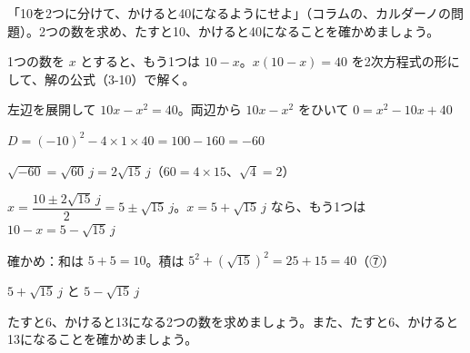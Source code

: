 \begin{reidai}
「10を2つに分けて、かけると40になるようにせよ」（コラムの、カルダーノの問題）。2つの数を求め、たすと10、かけると40になることを確かめましょう。\par
\kangaekata 1つの数を $x$ とすると、もう1つは $10-x$。$x(10-x)=40$ を2次方程式の形にして、解の公式（3-10）で解く。\par
\shiki{}\zw{} 左辺を展開して $10x-x^2=40$。両辺から $10x-x^2$ をひいて $0=x^2-10x+40$\par
\bkviia $D=(-10)^2-4\times1\times40=100-160=-60$\par
\bkviia $\sqrt{-60}=\sqrt{60}\,j=2\sqrt{15}\,j$（$60=4\times15$、$\sqrt4=2$）\par
\bkviia $x=\dfrac{10\pm2\sqrt{15}\,j}{2}=5\pm\sqrt{15}\,j$。$x=5+\sqrt{15}\,j$ なら、もう1つは $10-x=5-\sqrt{15}\,j$\par
\bkviia 確かめ：和は $5+5=10$。積は $5^2+(\sqrt{15})^2=25+15=40$（⑦）\par
\kotae{}\zw{} $5+\sqrt{15}\,j$ と $5-\sqrt{15}\,j$
\end{reidai}

\begin{jibun}
たすと6、かけると13になる2つの数を求めましょう。また、たすと6、かけると13になることを確かめましょう。
\end{jibun}

